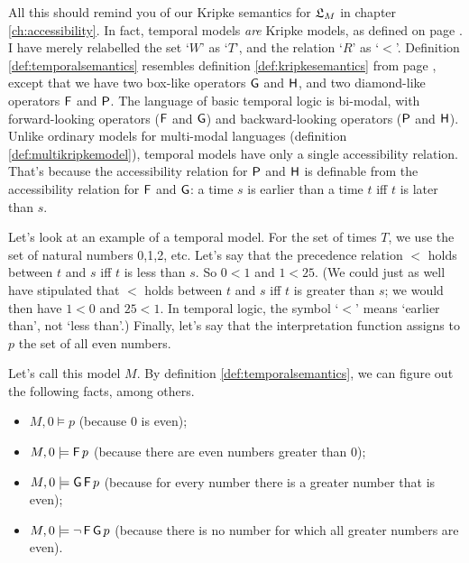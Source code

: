 All this should remind you of our Kripke semantics for $\mathfrak{L}_M$ in chapter
\ref{ch:accessibility}. In fact, temporal models \emph{are} Kripke models, as
defined on page \pageref{def:kripkemodel}. I have merely relabelled the set
`$W$' as `$T$', and the relation `$R$' as `$<$'. Definition
\ref{def:temporalsemantics} resembles definition \ref{def:kripkesemantics} from
page \pageref{def:kripkesemantics}, except that we have two box-like operators
$\operatorname{\mathsf{G}}$ and $\operatorname{\mathsf{H}}$, and two diamond-like operators $\operatorname{\mathsf{F}}$ and $\operatorname{\mathsf{P}}$. The language of
basic temporal logic is bi-modal, with forward-looking operators ($\operatorname{\mathsf{F}}$ and
$\operatorname{\mathsf{G}}$) and backward-looking operators ($\operatorname{\mathsf{P}}$ and $\operatorname{\mathsf{H}}$). Unlike ordinary models
for multi-modal languages (definition \ref{def:multikripkemodel}), temporal
models have only a single accessibility relation. That's because
the accessibility relation for $\operatorname{\mathsf{P}}$ and $\operatorname{\mathsf{H}}$ is definable from the
accessibility relation for $\operatorname{\mathsf{F}}$ and $\operatorname{\mathsf{G}}$: a time $s$ is earlier than a time
$t$ iff $t$ is later than $s$.


Let's look at an example of a temporal model. For the set of times $T$, we use
the set of natural numbers 0,1,2, etc. Let's say that the precedence relation
$<$ holds between $t$ and $s$ iff $t$ is less than $s$. So $0<1$ and
$1 < 25$. (We could just as well have stipulated that $<$ holds between $t$ and
$s$ iff $t$ is greater than $s$; we would then have $1<0$ and $25<1$. In
temporal logic, the symbol `$<$' means `earlier than', not `less than'.)
Finally, let's say that the interpretation function assigns to $p$ the set of
all even numbers.

Let's call this model $M$. By definition \ref{def:temporalsemantics}, we can
figure out the following facts, among others.
\begin{itemize}[leftmargin=10mm]
\itemsep-1mm
\item $M,0 \models p$ (because 0 is even);
\item $M,0 \models \tF p$ (because there are even numbers greater than 0);
\item $M,0 \models \tG\tF p$ (because for every number there is a greater number that is even);
\item $M,0 \models \neg\tF\tG p$ (because there is no number for which all greater numbers are even).
\end{itemize}

